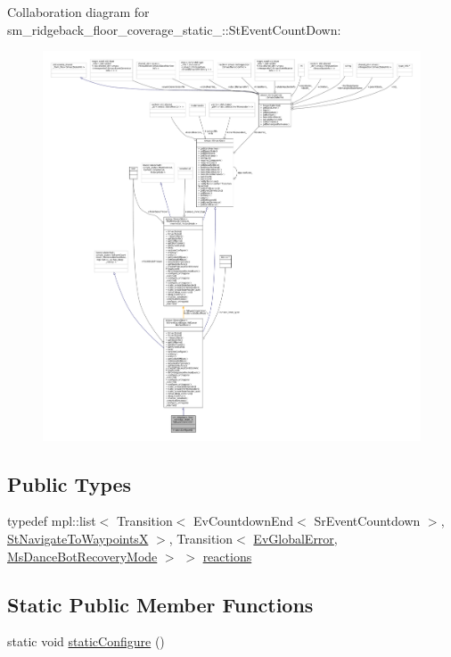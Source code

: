Collaboration diagram for sm\+\_\+ridgeback\+\_\+floor\+\_\+coverage\+\_\+static\+\_\+:\+:St\+Event\+Count\+Down\+:
\nopagebreak
\begin{figure}[H]
\begin{center}
\leavevmode
\includegraphics[width=350pt]{structsm__ridgeback__floor__coverage__static__1_1_1StEventCountDown__coll__graph}
\end{center}
\end{figure}
\subsection*{Public Types}
\begin{DoxyCompactItemize}
\item 
typedef mpl\+::list$<$ Transition$<$ Ev\+Countdown\+End$<$ Sr\+Event\+Countdown $>$, \hyperlink{structsm__ridgeback__floor__coverage__static__1_1_1StNavigateToWaypointsX}{St\+Navigate\+To\+WaypointsX} $>$, Transition$<$ \hyperlink{structsm__ridgeback__floor__coverage__static__1_1_1EvGlobalError}{Ev\+Global\+Error}, \hyperlink{classsm__ridgeback__floor__coverage__static__1_1_1MsDanceBotRecoveryMode}{Ms\+Dance\+Bot\+Recovery\+Mode} $>$ $>$ \hyperlink{structsm__ridgeback__floor__coverage__static__1_1_1StEventCountDown_a8a50d333167a3f6846dde61cda0d0b43}{reactions}
\end{DoxyCompactItemize}
\subsection*{Static Public Member Functions}
\begin{DoxyCompactItemize}
\item 
static void \hyperlink{structsm__ridgeback__floor__coverage__static__1_1_1StEventCountDown_aef24befbf9c60e4f9c3e068d13c69728}{static\+Configure} ()
\end{DoxyCompactItemize}
